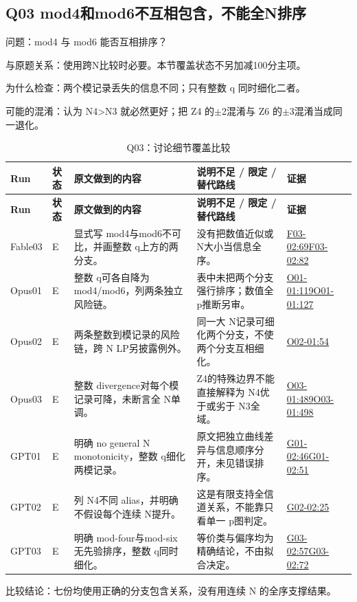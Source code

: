 \documentclass[11pt,a4paper]{article}
\begin{document}
\clearpage
\subsection{Q03 mod4和mod6不互相包含，不能全N排序}
\label{aspect:Q03}
问题：mod4 与 mod6 能否互相排序？

与原题关系：使用跨N比较时必要。本节覆盖状态不另加减100分主项。

为什么检查：两个模记录丢失的信息不同；只有整数 q 同时细化二者。

可能的混淆：认为 N4>N3 就必然更好；把 Z4 的\ensuremath{\pm}2混淆与 Z6 的\ensuremath{\pm}3混淆当成同一退化。

{\fontsize{9.0}{12.6}\selectfont
\setlength{\tabcolsep}{2.5pt}
\begin{longtable}{>{\raggedright\arraybackslash}p{}>{\raggedright\arraybackslash}p{}>{\raggedright\arraybackslash}p{}>{\raggedright\arraybackslash}p{}>{\raggedright\arraybackslash}p{}}
\caption{Q03：讨论细节覆盖比较}\\
\toprule
\textbf{Run} & \textbf{状态} & \textbf{原文做到的内容} & \textbf{说明不足 / 限定 / 替代路线} & \textbf{证据}\tabularnewline
\midrule
\endfirsthead
\toprule
\textbf{Run} & \textbf{状态} & \textbf{原文做到的内容} & \textbf{说明不足 / 限定 / 替代路线} & \textbf{证据}\tabularnewline
\midrule
\endhead
{}Fable03 & E & 显式写 mod4与mod6不可比，并画整数 q上方的两分支。 & 没有把数值近似或 N大小当信息全序。 & \hyperref[src:F03-02]{F03-02:69}\newline \hyperref[src:F03-02]{F03-02:82}\tabularnewline
{}Opus01 & E & 整数 q可各自降为 mod4/mod6，列两条独立风险链。 & 表中未把两个分支强行排序；数值全 p推断另审。 & \hyperref[src:O01-01]{O01-01:119}\newline \hyperref[src:O01-01]{O01-01:127}\tabularnewline
{}Opus02 & E & 两条整数到模记录的风险链，跨 N LP另披露例外。 & 同一大 N记录可细化两个分支，不使两个分支互相细化。 & \hyperref[src:O02-01]{O02-01:54}\tabularnewline
{}Opus03 & E & 整数 divergence对每个模记录可降，未断言全 N单调。 & Z4的特殊边界不能直接解释为 N4优于或劣于 N3全域。 & \hyperref[src:O03-01]{O03-01:489}\newline \hyperref[src:O03-01]{O03-01:498}\tabularnewline
{}GPT01 & E & 明确 no general N monotonicity，整数 q细化两模记录。 & 原文把独立曲线差异与信息顺序分开，未见错误排序。 & \hyperref[src:G01-02]{G01-02:46}\newline \hyperref[src:G01-02]{G01-02:51}\tabularnewline
{}GPT02 & E & 列 N4不同 alias，并明确不假设每个连续 N提升。 & 这是有限支持全信道关系，不能靠只看单一 p图判定。 & \hyperref[src:G02-02]{G02-02:25}\tabularnewline
{}GPT03 & E & 明确 mod-four与mod-six无先验排序，整数 q同时细化。 & 等价类与偏序均为精确结论，不由拟合决定。 & \hyperref[src:G03-02]{G03-02:57}\newline \hyperref[src:G03-02]{G03-02:72}\tabularnewline
\bottomrule
\end{longtable}
}
比较结论：七份均使用正确的分支包含关系，没有用连续 N 的全序支撑结果。
\end{document}
